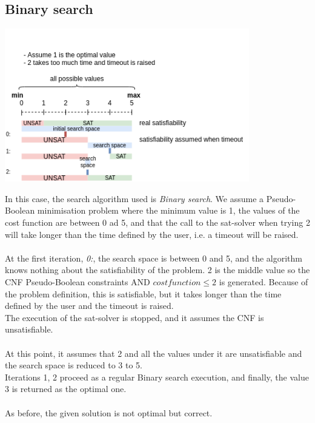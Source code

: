 \subsection{Binary search}
\begin{center}
	\includegraphics[width=0.8\textwidth]{Figures/SimpleTimeoutBinarySearch.png}
	\label{SimpleTimeoutBinarySearch}
\end{center}
In this case, the search algorithm used is \emph{Binary search}. We assume a Pseudo-Boolean minimisation problem where the minimum value is 1, the values of the cost function are between 0 ad 5, and that the call to the sat-solver when trying 2 will take longer than the time defined by the user, i.e. a timeout will be raised.\\\\
At the first iteration, \emph{0:}, the search space is between 0 and 5, and the algorithm knows nothing about the satisfiability of the problem. 2 is the middle value so the CNF Pseudo-Boolean constraints AND $cost function \leq 2$ is generated. Because of the problem definition, this is satisfiable, but it takes longer than the time defined by the user and the timeout is raised.\\
The execution of the sat-solver is stopped, and it assumes the CNF is unsatisfiable.\\\\
At this point, it assumes that 2 and all the values under it are unsatisfiable and the search space is reduced to 3 to 5.\\
Iterations 1, 2 proceed as a regular Binary search execution, and finally, the value 3 is returned as the optimal one.\\\\
As before, the given solution is not optimal but correct.

